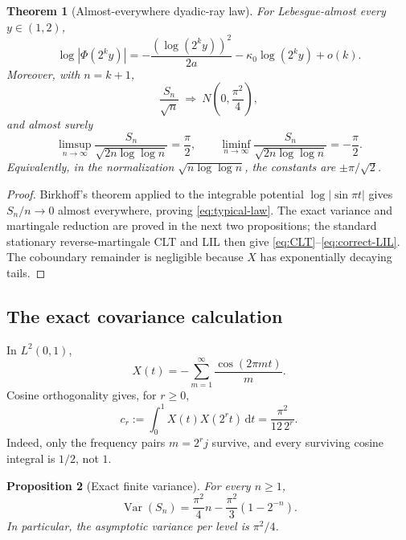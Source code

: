 \documentclass[11pt]{article}
\newtheorem{theorem}{Theorem}[section]
\newtheorem{proposition}[theorem]{Proposition}
\theoremstyle{definition}
\theoremstyle{remark}
\newcommand{\dd}{\,\mathrm d}
\newcommand{\Var}{\operatorname{Var}}
\begin{document}
\begin{theorem}[Almost-everywhere dyadic-ray law]
\label{thm:typical}
For Lebesgue-almost every \(y\in(1,2)\),
\begin{equation}
 \log|\Phi(2^ky)|
 =-\frac{(\log(2^ky))^2}{2a}
 -\kappa_0\log(2^ky)+o(k).
 \label{eq:typical-law}
\end{equation}
Moreover, with \(n=k+1\),
\begin{equation}
 \frac{S_n}{\sqrt n}\ \Longrightarrow\
 N\!\left(0,\frac{\pi^2}{4}\right),
 \label{eq:CLT}
\end{equation}
and almost surely
\begin{equation}
 \limsup_{n\to\infty}\frac{S_n}{\sqrt{2n\log\log n}}=\frac\pi2,
 \qquad
 \liminf_{n\to\infty}\frac{S_n}{\sqrt{2n\log\log n}}=-\frac\pi2.
 \label{eq:correct-LIL}
\end{equation}
Equivalently, in the normalization \(\sqrt{n\log\log n}\), the constants are
\(\pm\pi/\sqrt2\).
\end{theorem}

\begin{proof}
Birkhoff's theorem applied to the integrable potential
\(\log|\sin\pi t|\) gives \(S_n/n\to0\) almost everywhere, proving
\eqref{eq:typical-law}.  The exact variance and martingale reduction are proved
in the next two propositions; the standard stationary reverse-martingale CLT
and LIL\cite{hallheyde} then give \eqref{eq:CLT}--\eqref{eq:correct-LIL}.  The coboundary
remainder is negligible because \(X\) has exponentially decaying tails.
\end{proof}

\subsection{The exact covariance calculation}

In \(L^2(0,1)\),
\begin{equation}
 X(t)=-\sum_{m=1}^{\infty}\frac{\cos(2\pi mt)}{m}.
 \label{eq:Clausen}
\end{equation}
Cosine orthogonality gives, for \(r\ge0\),
\begin{equation}
 c_r:=\int_0^1X(t)X(2^rt)\dd t
 =\frac{\pi^2}{12\,2^r}.
 \label{eq:covariance}
\end{equation}
Indeed, only the frequency pairs \(m=2^rj\) survive, and every surviving
cosine integral is \(1/2\), not \(1\).

\begin{proposition}[Exact finite variance]
\label{prop:variance}
For every \(n\ge1\),
\begin{equation}
 \Var(S_n)
 =\frac{\pi^2}{4}n-\frac{\pi^2}{3}(1-2^{-n}).
 \label{eq:exact-variance}
\end{equation}
In particular, the asymptotic variance per level is \(\pi^2/4\).
\end{proposition}
\end{document}
